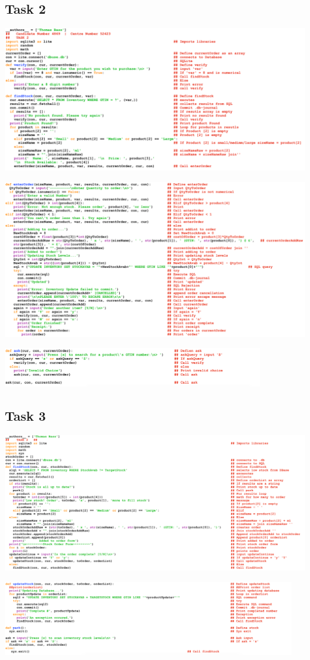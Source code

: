 \documentclass[a4paper]{article}
\begin{document}
\subsection{Task 2}
\noindent\includegraphics[width=1\textwidth, left]{task2FINALCODE1.png} \par
\noindent\includegraphics[width=1.039\textwidth, left]{task2FINALCODE2.png} \par
\noindent\includegraphics[width=0.85\textwidth, left]{task2FINALCODE3.png}
\newpage
\subsection{Task 3}
\noindent\includegraphics[width=1\textwidth, left]{task3FINALCODE1.png} \par
\noindent\includegraphics[width=0.955\textwidth, left]{task3FINALCODE2.png} \par
\end{document}
